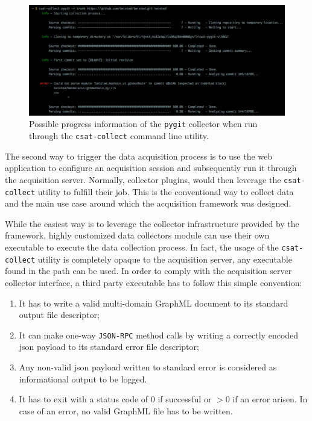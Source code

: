 \begin{figure}
  \centering
  \includegraphics[width=\linewidth]{images/pygit-output}
  \caption[Example output of the \texttt{pygit} collector.]{Possible progress information of the \texttt{pygit} collector when run through the \texttt{csat-collect} command line utility.}
  \label{fig:pygit-output}
\end{figure}

The second way to trigger the data acquisition process is to use the web application to configure an acquisition session and subsequently run it through the acquisition server. Normally, collector plugins, would then leverage the \texttt{csat-collect} utility to fulfill their job. This is the conventional way to collect data and the main use case around which the acquisition framework was designed.

While the easiest way is to leverage the collector infrastructure provided by the framework, highly customized data collectors module can use their own executable to execute the data collection process. In fact, the usage of the \texttt{csat-collect} utility is completely opaque to the acquisition server, any executable found in the path can be used. In order to comply with the acquisition server collector interface, a third party executable has to follow this simple convention:

\begin{enumerate}
  \item It has to write a valid multi-domain GraphML document to its standard output file descriptor;
  \item It can make one-way \texttt{JSON-RPC} method calls by writing a correctly encoded \gls{json} payload to its standard error file descriptor;
  \item Any non-valid \gls{json} payload written to standard error is considered as informational output to be logged.
  \item It has to exit with a status code of $0$ if successful or $>0$ if an error arisen. In case of an error, no valid GraphML file has to be written.
\end{enumerate}

